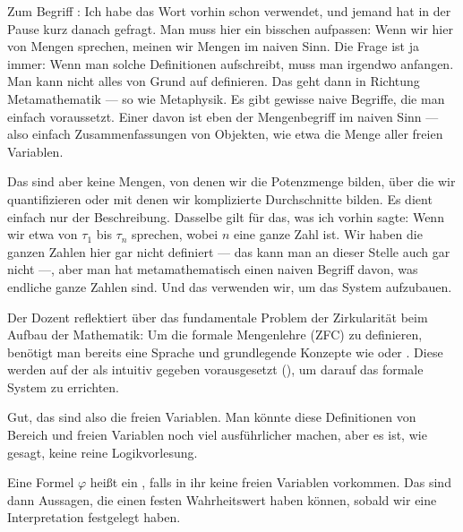 \begin{spoken-clean}[01:08:27 - 01:11:27]
Zum Begriff : Ich habe das Wort vorhin schon verwendet, und jemand hat in der Pause kurz danach gefragt. Man muss hier ein bisschen aufpassen: Wenn wir hier von Mengen sprechen, meinen wir Mengen im naiven Sinn. Die Frage ist ja immer: Wenn man solche Definitionen aufschreibt, muss man irgendwo anfangen. Man kann nicht alles von Grund auf definieren. Das geht dann in Richtung Metamathematik --- so wie Metaphysik. Es gibt gewisse naive Begriffe, die man einfach voraussetzt. Einer davon ist eben der Mengenbegriff im naiven Sinn --- also einfach Zusammenfassungen von Objekten, wie etwa die Menge aller freien Variablen.

Das sind aber keine Mengen, von denen wir die Potenzmenge bilden, über die wir quantifizieren oder mit denen wir komplizierte Durchschnitte bilden. Es dient einfach nur der Beschreibung. Dasselbe gilt für das, was ich vorhin sagte: Wenn wir etwa von $\tau_1$ bis $\tau_n$ sprechen, wobei $n$ eine ganze Zahl ist. Wir haben die ganzen Zahlen hier gar nicht definiert --- das kann man an dieser Stelle auch gar nicht ---, aber man hat metamathematisch einen naiven Begriff davon, was endliche ganze Zahlen sind. Und das verwenden wir, um das System aufzubauen.
\end{spoken-clean}

\begin{didactic-insight}
Der Dozent reflektiert über das fundamentale Problem der Zirkularität beim Aufbau der Mathematik: Um die formale Mengenlehre (ZFC) zu definieren, benötigt man bereits eine Sprache und grundlegende Konzepte wie  oder . Diese werden auf der  als intuitiv gegeben vorausgesetzt (), um darauf das formale System zu errichten.
\end{didactic-insight}

\begin{spoken-clean}[01:11:27 - 01:13:27]
Gut, das sind also die freien Variablen. Man könnte diese Definitionen von Bereich und freien Variablen noch viel ausführlicher machen, aber es ist, wie gesagt, keine reine Logikvorlesung.

Eine Formel $\varphi$ heißt ein , falls in ihr keine freien Variablen vorkommen.  Das sind dann Aussagen, die einen festen Wahrheitswert haben können, sobald wir eine Interpretation festgelegt haben.
\end{spoken-clean}

